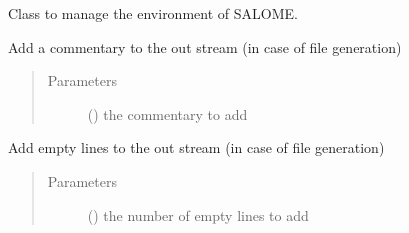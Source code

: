 \documentclass[a4paper,10pt,english]{sphinxmanual}
\begin{document}
\begin{fulllineitems}
\label{\detokenize{commands/apidoc/src:src.environment.SalomeEnviron}}
Class to manage the environment of SALOME.

\begin{fulllineitems}
\label{\detokenize{commands/apidoc/src:src.environment.SalomeEnviron.add_comment}}
Add a commentary to the out stream (in case of file generation)
\begin{quote}\begin{description}
\item[{Parameters}] \leavevmode
{} () \textendash{} the commentary to add

\end{description}\end{quote}

\end{fulllineitems}


\begin{fulllineitems}
\label{\detokenize{commands/apidoc/src:src.environment.SalomeEnviron.add_line}}
Add empty lines to the out stream (in case of file generation)
\begin{quote}\begin{description}
\item[{Parameters}] \leavevmode
{} () \textendash{} the number of empty lines to add

\end{description}\end{quote}

\end{fulllineitems}



\end{fulllineitems}
\end{document}
